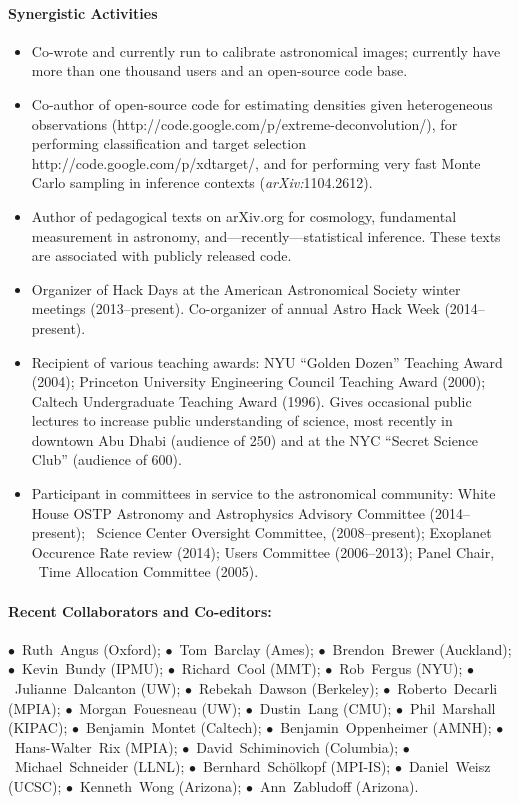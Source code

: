 \documentclass[letterpaper,12pt]{article}
\begin{document}
\paragraph{Synergistic Activities}
\begin{itemize}\setlength{\itemsep}{0pt}
\item
Co-wrote and currently run  to calibrate
astronomical images; currently have more than one thousand users and
an open-source code base.
\item
Co-author of open-source code for estimating densities
given heterogeneous observations
(http://code.google.com/p/extreme-deconvolution/), for performing
classification and target selection
http://code.google.com/p/xdtarget/, and for performing very fast Monte
Carlo sampling in inference contexts (\textit{arXiv:}1104.2612).
\item
Author of pedagogical texts on arXiv.org for cosmology, fundamental
measurement in astronomy, and---recently---statistical inference.
These texts are associated with publicly released code.
\item
Organizer of Hack Days at the American Astronomical Society winter meetings (2013--present).
Co-organizer of annual Astro Hack Week (2014--present).
\item
Recipient of various teaching awards: 
NYU ``Golden Dozen'' Teaching Award (2004);
Princeton University Engineering Council Teaching Award (2000);
Caltech Undergraduate Teaching Award (1996).
Gives occasional public lectures to increase public understanding of
science, most recently in downtown Abu Dhabi (audience of 250) and at
the NYC ``Secret Science Club'' (audience of 600).
\item
Participant in committees in service to the astronomical community:
White House OSTP Astronomy and Astrophysics Advisory Committee (2014--present);
\Spitzer\ Science Center Oversight Committee, (2008--present); 
 Exoplanet Occurence Rate review (2014);
 Users Committee (2006--2013);
Panel Chair, \Spitzer\ Time Allocation Committee (2005).
\end{itemize}

\paragraph{Recent Collaborators and Co-editors:}
$\bullet$~Ruth~Angus (Oxford);
$\bullet$~Tom~Barclay (Ames);
$\bullet$~Brendon~Brewer (Auckland);
$\bullet$~Kevin~Bundy (IPMU);
$\bullet$~Richard~Cool (MMT);
$\bullet$~Rob~Fergus (NYU);
$\bullet$~Julianne~Dalcanton (UW);
$\bullet$~Rebekah~Dawson (Berkeley);
$\bullet$~Roberto~Decarli (MPIA);
$\bullet$~Morgan~Fouesneau (UW);
$\bullet$~Dustin~Lang (CMU);
$\bullet$~Phil~Marshall (KIPAC);
$\bullet$~Benjamin~Montet (Caltech);
$\bullet$~Benjamin~Oppenheimer (AMNH);
$\bullet$~Hans-Walter~Rix (MPIA);
$\bullet$~David~Schiminovich (Columbia);
$\bullet$~Michael~Schneider (LLNL);
$\bullet$~Bernhard~Sch\"olkopf (MPI-IS);
$\bullet$~Daniel~Weisz (UCSC);
$\bullet$~Kenneth~Wong (Arizona);
$\bullet$~Ann~Zabludoff (Arizona).
\end{document}
